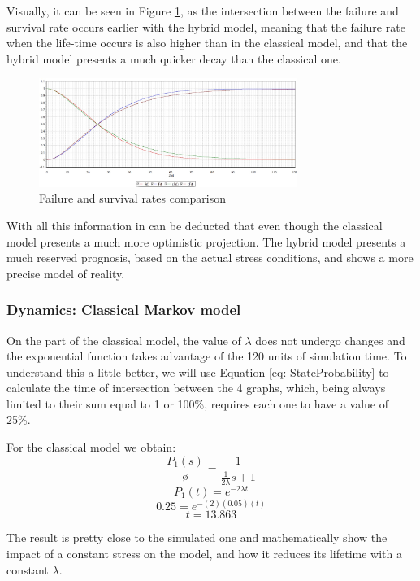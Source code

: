 \documentclass{article}
\begin{document}
\begin{doublespacing}
\par Visually, it can be seen in Figure \ref{fig:CFS}, as the intersection between the failure and survival rate occurs earlier with the hybrid model, meaning that the failure rate when the life-time occurs is also higher than in the classical model, and that the hybrid model presents a much quicker decay than the classical one.

\begin{figure}[H] 
    \centering
    \includegraphics[width=0.75\textwidth]{Images/ComparisonRates.JPG} 
    \caption{Failure and survival rates comparison} 
    \label{fig:CFS} 
\end{figure}

\par With all this information in can be deducted that even though the classical model presents a much more optimistic projection. The hybrid model  presents a much reserved prognosis, based on the actual stress conditions, and shows a more precise model of reality.

\subsubsection{Dynamics: Classical Markov model}

\par On the part of the classical model, the value of $\lambda$ does not undergo changes and the exponential function takes advantage of the 120 units of simulation time. To understand this a little better, we will use Equation \ref{eq: StateProbability} to calculate the time of intersection between the 4 graphs, which, being always limited to their sum equal to 1 or 100\%, requires each one to have a value of 25\%.


\par For the classical model we obtain:
$$\frac{P_1 (s)}{ø} = \frac{1}{\frac{1}{2 \lambda} s + 1}$$
$$P_1 (t) = e^{-2 \lambda t}$$
$$0.25 = e^{-(2)(0.05)(t)}$$
$$t = 13.863$$


\par The result is pretty close to the simulated one and mathematically show the impact of a constant stress on the model, and how it reduces its lifetime with a constant $\lambda$. 



\end{doublespacing}
\end{document}
